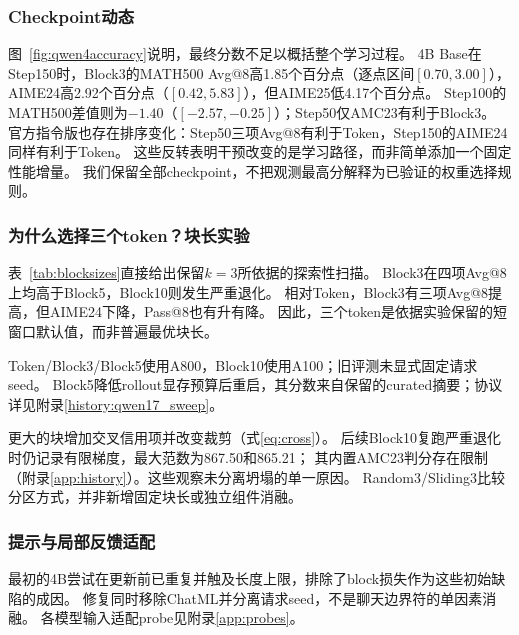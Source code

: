 \subsubsection{Checkpoint动态}
图~\ref{fig:qwen4accuracy}说明，最终分数不足以概括整个学习过程。
4B Base在Step150时，Block3的MATH500 Avg@8高1.85个百分点（逐点区间$[0.70,3.00]$），
AIME24高2.92个百分点（$[0.42,5.83]$），但AIME25低4.17个百分点。
Step100的MATH500差值则为$-1.40$（$[-2.57,-0.25]$）；Step50仅AMC23有利于Block3。
官方指令版也存在排序变化：Step50三项Avg@8有利于Token，Step150的AIME24同样有利于Token。
这些反转表明干预改变的是学习路径，而非简单添加一个固定性能增量。
我们保留全部checkpoint，不把观测最高分解释为已验证的权重选择规则。

\subsubsection{为什么选择三个token？块长实验}
\label{sec:blockchoice}
表~\ref{tab:blocksizes}直接给出保留$k=3$所依据的探索性扫描。
Block3在四项Avg@8上均高于Block5，Block10则发生严重退化。
相对Token，Block3有三项Avg@8提高，但AIME24下降，Pass@8也有升有降。
因此，三个token是依据实验保留的短窗口默认值，而非普遍最优块长。

\begin{table}[htbp]
\centering\small
\caption{历史块长扫描：Qwen3-1.7B-Base学生、4B-GRPO教师，DAPO训练200步、seed21。单元格为Avg@8 / Pass@8（\%）；不是后续同机配对实验。}
\label{tab:blocksizes}

\par\smallskip\footnotesize
Token/Block3/Block5使用A800，Block10使用A100；旧评测未显式固定请求seed。
Block5降低rollout显存预算后重启，其分数来自保留的curated摘要；协议详见附录\ref{history:qwen17_sweep}。
\end{table}

更大的块增加交叉信用项并改变裁剪（式\ref{eq:cross}）。
后续Block10复跑严重退化时仍记录有限梯度，最大范数为867.50和865.21；
其内置AMC23判分存在限制（附录\ref{app:history}）。这些观察未分离坍塌的单一原因。
Random3/Sliding3比较分区方式，并非新增固定块长或独立组件消融。

\subsubsection{提示与局部反馈适配}
最初的4B尝试在更新前已重复并触及长度上限，排除了block损失作为这些初始缺陷的成因。
修复同时移除ChatML并分离请求seed，不是聊天边界符的单因素消融。
各模型输入适配probe见附录\ref{app:probes}。

